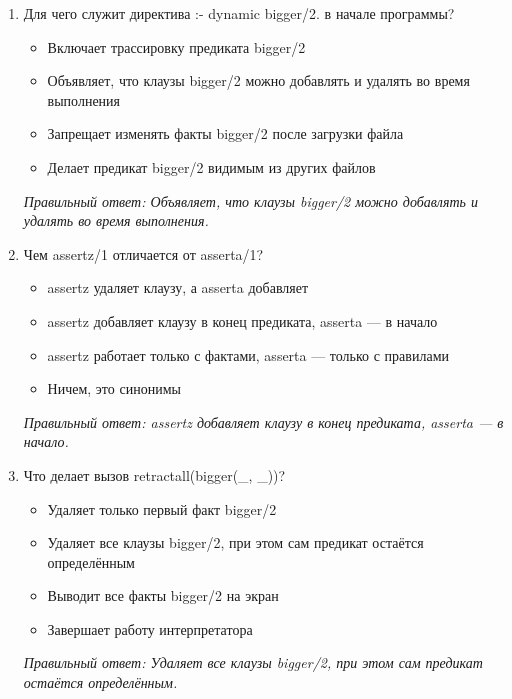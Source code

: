 \small
\begin{enumerate}[label=\textbf{\arabic*.}, leftmargin=0pt, itemsep=1.2em]
\item Для чего служит директива :- dynamic bigger/2. в начале программы?
\begin{itemize}[label=$\square$, leftmargin=1.5cm, itemsep=0.2em, topsep=0.3em]
\item Включает трассировку предиката bigger/2
\item Объявляет, что клаузы bigger/2 можно добавлять и удалять во время выполнения
\item Запрещает изменять факты bigger/2 после загрузки файла
\item Делает предикат bigger/2 видимым из других файлов
\end{itemize}
{\small\textit{Правильный ответ: Объявляет, что клаузы bigger/2 можно добавлять и удалять во время выполнения.}}

\item Чем assertz/1 отличается от asserta/1?
\begin{itemize}[label=$\square$, leftmargin=1.5cm, itemsep=0.2em, topsep=0.3em]
\item assertz удаляет клаузу, а asserta добавляет
\item assertz добавляет клаузу в конец предиката, asserta — в начало
\item assertz работает только с фактами, asserta — только с правилами
\item Ничем, это синонимы
\end{itemize}
{\small\textit{Правильный ответ: assertz добавляет клаузу в конец предиката, asserta — в начало.}}

\item Что делает вызов retractall(bigger(\_, \_))?
\begin{itemize}[label=$\square$, leftmargin=1.5cm, itemsep=0.2em, topsep=0.3em]
\item Удаляет только первый факт bigger/2
\item Удаляет все клаузы bigger/2, при этом сам предикат остаётся определённым
\item Выводит все факты bigger/2 на экран
\item Завершает работу интерпретатора
\end{itemize}
{\small\textit{Правильный ответ: Удаляет все клаузы bigger/2, при этом сам предикат остаётся определённым.}}


\end{enumerate}

